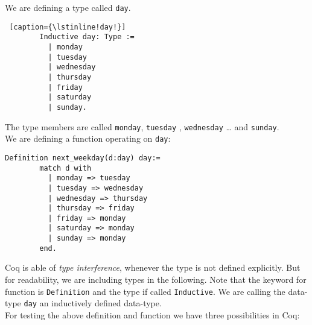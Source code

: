 	  
	  \begin{example}
	  We are defining a type called \lstinline!day!.~\\\vspace{-10mm}
	  {\normalfont \begin{lstlisting} [caption={\lstinline!day!}] 
	    Inductive day: Type :=
		  | monday
		  | tuesday
		  | wednesday
		  | thursday
		  | friday
		  | saturday
		  | sunday.
	  \end{lstlisting}}
	  The type members are called \lstinline!monday!, \lstinline!tuesday! , \lstinline!wednesday! \ldots{} and \lstinline!sunday!.\\
	  We are defining a function operating on \lstinline!day!: 
	  {\normalfont \begin{lstlisting}[caption = {\lstinline!next_weekday!}]
	  Definition next_weekday(d:day) day:=
	    match d with 
		  | monday => tuesday
		  | tuesday => wednesday
		  | wednesday => thursday
		  | thursday => friday
		  | friday => monday
		  | saturday => monday
		  | sunday => monday
	    end.  
	  \end{lstlisting}}
	  \end{example}
	  Coq is able of {\itshape type  interference}, whenever the type is not defined explicitly.
	  But for readability, we are including types in the following.
	 Note that the keyword for function is \lstinline!Definition! and the type if called \lstinline!Inductive!. 
	 We are calling the data-type \lstinline!day! an inductively defined data-type. 	 
	 \\   
	  
	  For testing the above definition and function we have three possibilities in Coq:
	     
